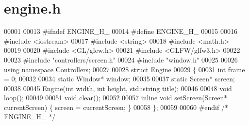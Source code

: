\section{engine.\+h}
\label{engine_8h_source}

\begin{DoxyCode}
00001 
00013 \textcolor{preprocessor}{#ifndef ENGINE\_H\_}
00014 \textcolor{preprocessor}{#define ENGINE\_H\_}
00015 
00016 \textcolor{preprocessor}{#include <iostream>}
00017 \textcolor{preprocessor}{#include <string>}
00018 \textcolor{preprocessor}{#include <math.h>}
00019 
00020 \textcolor{preprocessor}{#include <GL/glew.h>}
00021 \textcolor{preprocessor}{#include <GLFW/glfw3.h>}
00022 
00023 \textcolor{preprocessor}{#include "controllers/screen.h"}
00024 \textcolor{preprocessor}{#include "window.h"}
00025 
00026 \textcolor{keyword}{using namespace }Controllers;
00027 
00028 \textcolor{keyword}{struct }Engine
00029 \{
00031     \textcolor{keywordtype}{int} frame = 0;
00032 
00034     \textcolor{keyword}{static} Window* window;
00035 
00037     \textcolor{keyword}{static} Screen* screen;
00038 
00045     Engine(\textcolor{keywordtype}{int} width, \textcolor{keywordtype}{int} height, std::string title);
00046     
00048     \textcolor{keywordtype}{void} loop();
00049 
00051     \textcolor{keywordtype}{void} clear();
00052 
00057     \textcolor{keyword}{inline} \textcolor{keywordtype}{void} setScreen(Screen* currentScreen) \{ screen = currentScreen; \}
00058 \};
00059 
00060 \textcolor{preprocessor}{#endif }\textcolor{comment}{/* ENGINE\_H\_ */}\textcolor{preprocessor}{}
\end{DoxyCode}
